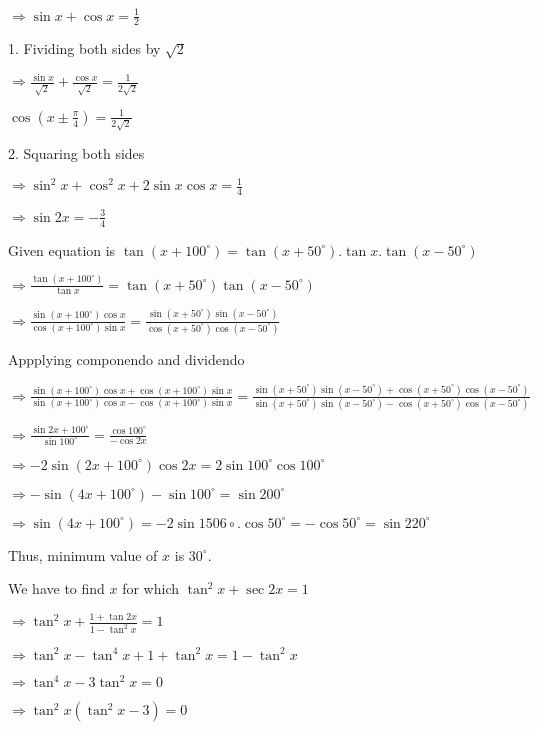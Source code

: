   $\Rightarrow \sin x + \cos x = \frac{1}{2}$

  1. Fividing both sides by $\sqrt{2}$

  $\Rightarrow \frac{\sin x}{\sqrt{2}} + \frac{\cos x}{\sqrt{2}} = \frac{1}{2\sqrt{2}}$

  $\cos\left(x \pm \frac{\pi}{4}\right) = \frac{1}{2\sqrt{2}}$

  2. Squaring both sides

  $\Rightarrow \sin^2x + \cos^2x + 2\sin x\cos x = \frac{1}{4}$

  $\Rightarrow \sin 2x = -\frac{3}{4}$

\item Given equation is $\tan(x + 100^\circ) = \tan(x + 50^\circ).\tan x.\tan(x - 50^\circ)$

  $\Rightarrow \frac{\tan(x+100^\circ)}{\tan x} = \tan(x+50^\circ)\tan(x-50^\circ)$

  $\Rightarrow \frac{\sin(x+100^\circ)\cos x}{\cos(x + 100^\circ)\sin x} =
  \frac{\sin(x+50^\circ)\sin(x-50^\circ)}{\cos(x+50^\circ)\cos(x-50^\circ)}$

  Appplying componendo and dividendo

  $\Rightarrow \frac{\sin(x + 100^\circ)\cos x + \cos(x + 100^\circ)\sin x}{\sin(x + 100^\circ)\cos x - \cos(x +
    100^\circ)\sin x} = \frac{\sin(x+50^\circ)\sin(x-50^\circ) + \cos(x+50^\circ)\cos(x-50^\circ)}{\sin(x+50^\circ)\sin(x-50^\circ)
    -\cos(x+50^\circ)\cos(x-50^\circ)}$

  $\Rightarrow \frac{\sin 2x + 100^\circ}{\sin100^\circ} = \frac{\cos100^\circ}{-\cos 2x}$

  $\Rightarrow -2\sin(2x + 100^\circ)\cos2x = 2\sin100^\circ\cos100^\circ$

  $\Rightarrow -\sin(4x + 100^\circ) - \sin100^\circ = \sin200^\circ$

  $\Rightarrow \sin(4x + 100^\circ) = -2\sin1506\circ.\cos50^\circ = -\cos50^\circ = \sin220^\circ$

  Thus, minimum value of $x$ is $30^\circ.$

\item We have to find $x$ for which $\tan^2x + \sec 2x = 1$

  $\Rightarrow \tan^2x + \frac{1 + \tan2x}{1 - \tan^2x} = 1$

  $\Rightarrow \tan^2x - \tan^4x + 1 + \tan^2x = 1 - \tan^2x$

  $\Rightarrow \tan^4x - 3\tan^2x = 0$

  $\Rightarrow \tan^2x(\tan^2x - 3) = 0$


